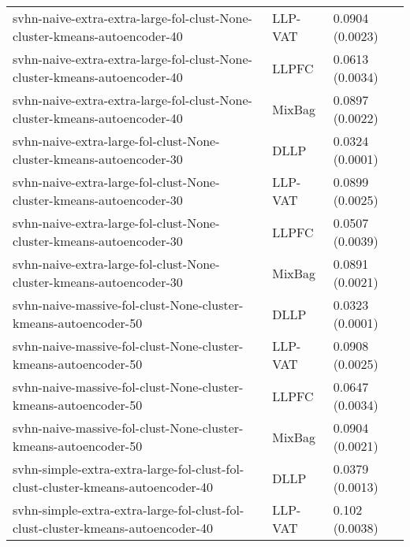 \begin{longtable}{lll}
                                    svhn-naive-extra-extra-large-fol-clust-None-cluster-kmeans-autoencoder-40 &   LLP-VAT &                           0.0904 (0.0023) \\
                                    svhn-naive-extra-extra-large-fol-clust-None-cluster-kmeans-autoencoder-40 &     LLPFC &                           0.0613 (0.0034) \\
                                    svhn-naive-extra-extra-large-fol-clust-None-cluster-kmeans-autoencoder-40 &    MixBag &                           0.0897 (0.0022) \\
                                          svhn-naive-extra-large-fol-clust-None-cluster-kmeans-autoencoder-30 &      DLLP &                           0.0324 (0.0001) \\
                                          svhn-naive-extra-large-fol-clust-None-cluster-kmeans-autoencoder-30 &   LLP-VAT &                           0.0899 (0.0025) \\
                                          svhn-naive-extra-large-fol-clust-None-cluster-kmeans-autoencoder-30 &     LLPFC &                           0.0507 (0.0039) \\
                                          svhn-naive-extra-large-fol-clust-None-cluster-kmeans-autoencoder-30 &    MixBag &                           0.0891 (0.0021) \\
                                              svhn-naive-massive-fol-clust-None-cluster-kmeans-autoencoder-50 &      DLLP &                           0.0323 (0.0001) \\
                                              svhn-naive-massive-fol-clust-None-cluster-kmeans-autoencoder-50 &   LLP-VAT &                           0.0908 (0.0025) \\
                                              svhn-naive-massive-fol-clust-None-cluster-kmeans-autoencoder-50 &     LLPFC &                           0.0647 (0.0034) \\
                                              svhn-naive-massive-fol-clust-None-cluster-kmeans-autoencoder-50 &    MixBag &                           0.0904 (0.0021) \\
                              svhn-simple-extra-extra-large-fol-clust-fol-clust-cluster-kmeans-autoencoder-40 &      DLLP &                           0.0379 (0.0013) \\
                              svhn-simple-extra-extra-large-fol-clust-fol-clust-cluster-kmeans-autoencoder-40 &   LLP-VAT &                            0.102 (0.0038) \\

\end{longtable}
